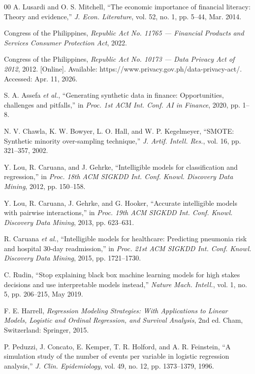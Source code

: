 \documentclass[journal]{./IEEE/IEEEtran}
\begin{document}
\begin{thebibliography}{00}
 A. Lusardi and O. S. Mitchell, ``The economic importance of financial literacy: Theory and evidence,'' \emph{J. Econ. Literature}, vol. 52, no. 1, pp. 5--44, Mar. 2014.

 Congress of the Philippines, \emph{Republic Act No. 11765 --- Financial Products and Services Consumer Protection Act}, 2022.

 Congress of the Philippines, \emph{Republic Act No. 10173 --- Data Privacy Act of 2012}, 2012. [Online]. Available: https://www.privacy.gov.ph/data-privacy-act/. Accessed: Apr. 11, 2026.

 S. A. Assefa \emph{et al.}, ``Generating synthetic data in finance: Opportunities, challenges and pitfalls,'' in \emph{Proc. 1st ACM Int. Conf. AI in Finance}, 2020, pp. 1--8.

 N. V. Chawla, K. W. Bowyer, L. O. Hall, and W. P. Kegelmeyer, ``SMOTE: Synthetic minority over-sampling technique,'' \emph{J. Artif. Intell. Res.}, vol. 16, pp. 321--357, 2002.

 Y. Lou, R. Caruana, and J. Gehrke, ``Intelligible models for classification and regression,'' in \emph{Proc. 18th ACM SIGKDD Int. Conf. Knowl. Discovery Data Mining}, 2012, pp. 150--158.

 Y. Lou, R. Caruana, J. Gehrke, and G. Hooker, ``Accurate intelligible models with pairwise interactions,'' in \emph{Proc. 19th ACM SIGKDD Int. Conf. Knowl. Discovery Data Mining}, 2013, pp. 623--631.

 R. Caruana \emph{et al.}, ``Intelligible models for healthcare: Predicting pneumonia risk and hospital 30-day readmission,'' in \emph{Proc. 21st ACM SIGKDD Int. Conf. Knowl. Discovery Data Mining}, 2015, pp. 1721--1730.

 C. Rudin, ``Stop explaining black box machine learning models for high stakes decisions and use interpretable models instead,'' \emph{Nature Mach. Intell.}, vol. 1, no. 5, pp. 206--215, May 2019.

 F. E. Harrell, \emph{Regression Modeling Strategies: With Applications to Linear Models, Logistic and Ordinal Regression, and Survival Analysis}, 2nd ed. Cham, Switzerland: Springer, 2015.

 P. Peduzzi, J. Concato, E. Kemper, T. R. Holford, and A. R. Feinstein, ``A simulation study of the number of events per variable in logistic regression analysis,'' \emph{J. Clin. Epidemiology}, vol. 49, no. 12, pp. 1373--1379, 1996.


\end{thebibliography}
\end{document}
